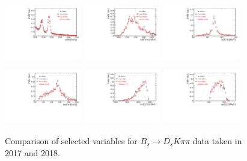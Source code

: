 \begin{figure}[h]
\centering
\includegraphics[height=!,width=0.3\textwidth]{figs/dataVsMC/year18vs17_signal/Ds2all_Bs_DTF_MM.pdf}
\includegraphics[height=!,width=0.3\textwidth]{figs/dataVsMC/year18vs17_signal/Ds2all_m_Kpipi.pdf}
\includegraphics[height=!,width=0.3\textwidth]{figs/dataVsMC/year18vs17_signal/Ds2all_m_Kpi.pdf}

\includegraphics[height=!,width=0.3\textwidth]{figs/dataVsMC/year18vs17_signal/Ds2all_m_pipi.pdf}
\includegraphics[height=!,width=0.3\textwidth]{figs/dataVsMC/year18vs17_signal/Ds2all_m_Dspipi.pdf}
\includegraphics[height=!,width=0.3\textwidth]{figs/dataVsMC/year18vs17_signal/Ds2all_m_Dspi.pdf}

\caption{Comparison of selected variables for $B_s \to D_s K \pi \pi$ data taken in 2017 and 2018.}
\label{fig:}
\end{figure}


